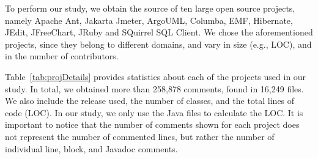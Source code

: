 \documentclass[conference]{IEEEtran}
\begin{document}
To perform our study, we obtain the source of ten large open source projects, namely Apache Ant, Jakarta Jmeter, ArgoUML,  Columba, EMF, Hibernate, JEdit, JFreeChart, JRuby and SQuirrel SQL Client. We chose the aforementioned projects, since they belong to different domains, and vary in size (e.g., LOC), and in the number of contributors.

Table~\ref{tab:projDetails} provides statistics about each of the projects used in our study. In total, we obtained more than 258,878 comments, found in 16,249 files. We also include the release used, the number of classes, and the total lines of code (LOC). In our study, we only use the Java files to calculate the LOC. It is important to notice that the number of comments shown for each project does not represent the number of commented lines, but rather the number of individual line, block, and Javadoc comments. 



\end{document}
